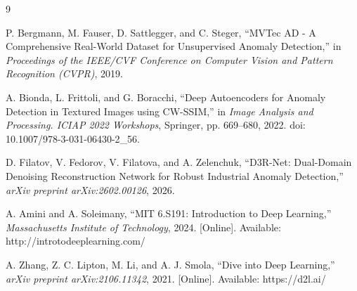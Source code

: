 \documentclass[10pt,twocolumn,a4paper]{article}
\begin{document}
\begin{thebibliography}{9}

    P. Bergmann, M. Fauser, D. Sattlegger, and C. Steger,
    ``MVTec AD - A Comprehensive Real-World Dataset for Unsupervised Anomaly Detection,''
    in \textit{Proceedings of the IEEE/CVF Conference on Computer Vision and Pattern Recognition (CVPR)},
    2019.
    
    A. Bionda, L. Frittoli, and G. Boracchi,
    ``Deep Autoencoders for Anomaly Detection in Textured Images using CW-SSIM,''
    in \textit{Image Analysis and Processing. ICIAP 2022 Workshops}, Springer, pp. 669--680, 2022. doi: 10.1007/978-3-031-06430-2\_56.
    
    D. Filatov, V. Fedorov, V. Filatova, and A. Zelenchuk,
    ``D3R-Net: Dual-Domain Denoising Reconstruction Network for Robust Industrial Anomaly Detection,''
    \textit{arXiv preprint arXiv:2602.00126}, 2026.

A. Amini and A. Soleimany,
``MIT 6.S191: Introduction to Deep Learning,''
\textit{Massachusetts Institute of Technology}, 2024. [Online]. Available: http://introtodeeplearning.com/

A. Zhang, Z. C. Lipton, M. Li, and A. J. Smola,
``Dive into Deep Learning,''
\textit{arXiv preprint arXiv:2106.11342}, 2021. [Online]. Available: https://d2l.ai/




        
		
		
		
		
	\end{thebibliography}
	
\end{document}
